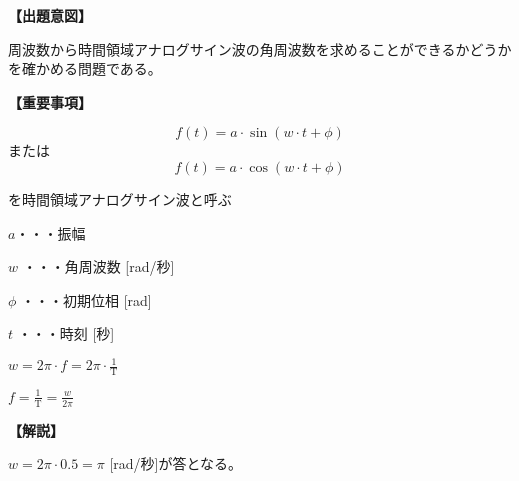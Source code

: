 \noindent \textbf{【出題意図】}

\noindent 周波数から時間領域アナログサイン波の角周波数を求めることができるかどうかを確かめる問題である。

\vspace{1em}
\noindent \textbf{【重要事項】}

\fleqnoff
\[
f(t) = a \cdot \sin( w \cdot t + \phi )
\]
\fleqnon
%
\noindent または
%
\fleqnoff
\[
f(t) = a \cdot \cos( w \cdot t + \phi )
\]
\fleqnon

\medskip
\noindent を時間領域アナログサイン波と呼ぶ

\bigskip
\noindent $a$・・・振幅

\bigskip
\noindent $w$ ・・・角周波数 [rad/秒]

\bigskip
\noindent $\phi$ ・・・初期位相 [rad]

\bigskip
\noindent $t$ ・・・時刻 [秒]

\bigskip
$w = 2\pi \cdot f = 2 \pi \cdot \frac{1}{\textrm{T}}$

\bigskip
$f = \frac{1}{\textrm{T}} = \frac{w}{2\pi}$

\vspace{1em}
\noindent \textbf{【解説】}

\noindent $w = 2\pi \cdot 0.5 = \pi$ [rad/秒]が答となる。
